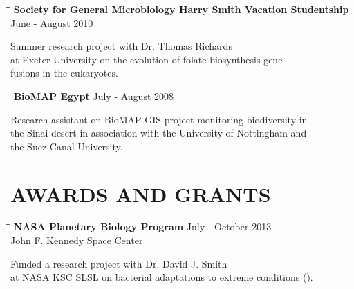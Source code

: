 \documentclass{res}
\begin{document}
\begin{resume}
   \vspace{-0.1in}
      \begin{tabbing}
   \hspace{2in}\= \hspace{2.6in}\= \kill 
    {\bf Society for General Microbiology Harry Smith Vacation Studentship} \> \>        June - August 2010\\
     \end{tabbing}\vspace{-20pt}      
Summer research project with Dr. Thomas Richards \\  at Exeter University on the evolution of folate biosynthesis gene \\fusions in the eukaryotes.

\vspace{-0.1in}
   \begin{tabbing}
   \hspace{2in}\= \hspace{2.6in}\= \kill 
    {\bf BioMAP Egypt} \> \>        July - August 2008\\
     \end{tabbing}\vspace{-20pt}      
Research assistant on BioMAP GIS project monitoring biodiversity in \\the Sinai desert in association with the University of Nottingham and \\the Suez Canal University.

\section{AWARDS AND GRANTS}

   \vspace{-0.05in}  

\vspace{-0.1in}  
   \begin{tabbing}
   \hspace{2in}\= \hspace{2.6in}\= \kill 
    {\bf NASA Planetary Biology Program} \> \>July - October 2013\\
                            \> 
                            \> John F. Kennedy Space Center\\

   \end{tabbing}\vspace{-30pt}     
   Funded a research project with Dr. David J. Smith \\  at NASA KSC SLSL on bacterial adaptations to extreme conditions ().


\end{resume}
\end{document}

